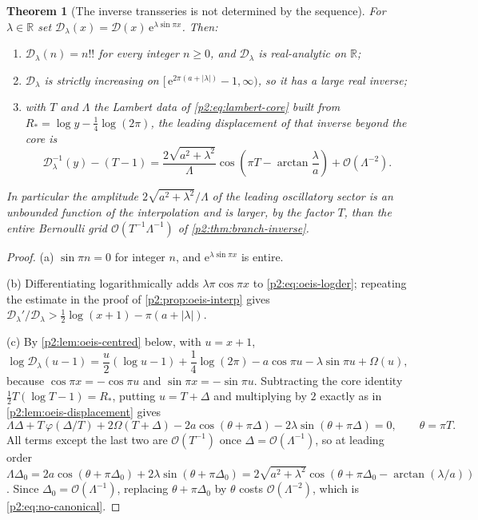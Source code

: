\documentclass[11pt,a4paper,oneside]{book}
\theoremstyle{plain}
\newtheorem{theorem}{Theorem}[chapter]
\theoremstyle{definition}
\theoremstyle{remark}
\newcommand{\Real}{\mathbb{R}}
\newcommand{\e}{\mathrm{e}}
\newcommand{\bigO}{\mathcal{O}}
\begin{document}
\begin{theorem}[The inverse transseries is not determined by the sequence]
\label{p2:thm:no-canonical}
For \(\lambda\in\Real\) set
\(\mathscr D_\lambda(x)=\mathscr D(x)\,\e^{\lambda\sin\pi x}\).
Then:
\begin{enumerate}[label=\textup{(\alph*)}]
\item \(\mathscr D_\lambda(n)=n!!\) for every integer \(n\ge0\), and
      \(\mathscr D_\lambda\) is real-analytic on \(\Real\);
\item \(\mathscr D_\lambda\) is strictly increasing on
      \([\,\e^{2\pi(a+|\lambda|)}-1,\infty)\), so it has a large real inverse;
\item with \(T\) and \(\Lambda\) the Lambert data of
      \cref{p2:eq:lambert-core} built from
      \(R_*=\log y-\tfrac14\log(2\pi)\), the leading displacement of that
      inverse beyond the core is
      \begin{equation}
       \mathscr D_\lambda^{-1}(y)-(T-1)
       =\frac{2\sqrt{a^2+\lambda^2}}{\Lambda}
        \cos\!\left(\pi T-\arctan\frac\lambda a\right)
        +\bigO\!\left(\Lambda^{-2}\right).
       \label{p2:eq:no-canonical}
      \end{equation}
\end{enumerate}
In particular the amplitude \(2\sqrt{a^2+\lambda^2}/\Lambda\) of the leading
oscillatory sector is an unbounded function of the interpolation and is
\emph{larger, by the factor \(T\), than the entire Bernoulli grid}
\(\bigO(T^{-1}\Lambda^{-1})\) of \cref{p2:thm:branch-inverse}.
\end{theorem}

\begin{proof}
(a) \(\sin\pi n=0\) for integer \(n\), and \(\e^{\lambda\sin\pi x}\) is entire.

(b) Differentiating logarithmically adds \(\lambda\pi\cos\pi x\) to
\cref{p2:eq:oeis-logder}; repeating the estimate in the proof of
\cref{p2:prop:oeis-interp} gives
\(\mathscr D_\lambda'/\mathscr D_\lambda>\tfrac12\log(x+1)-\pi(a+|\lambda|)\).

(c) By \cref{p2:lem:oeis-centred} below, with \(u=x+1\),
\[
 \log\mathscr D_\lambda(u-1)
 =\frac u2(\log u-1)+\frac14\log(2\pi)-a\cos\pi u
   -\lambda\sin\pi u+\Omega(u),
\]
because \(\cos\pi x=-\cos\pi u\) and \(\sin\pi x=-\sin\pi u\).  Subtracting the
core identity \(\tfrac12T(\log T-1)=R_*\), putting \(u=T+\Delta\) and
multiplying by \(2\) exactly as in \cref{p2:lem:oeis-displacement} gives
\[
 \Lambda\Delta+T\,\varphi(\Delta/T)
 +2\Omega(T+\Delta)
 -2a\cos(\theta+\pi\Delta)-2\lambda\sin(\theta+\pi\Delta)=0,
 \qquad\theta=\pi T .
\]
All terms except the last two are \(\bigO(T^{-1})\) once
\(\Delta=\bigO(\Lambda^{-1})\), so at leading order
\(\Lambda\Delta_0=2a\cos(\theta+\pi\Delta_0)+2\lambda\sin(\theta+\pi\Delta_0)
=2\sqrt{a^2+\lambda^2}\cos(\theta+\pi\Delta_0-\arctan(\lambda/a))\).
Since \(\Delta_0=\bigO(\Lambda^{-1})\), replacing
\(\theta+\pi\Delta_0\) by \(\theta\) costs \(\bigO(\Lambda^{-2})\), which is
\cref{p2:eq:no-canonical}.
\end{proof}
\end{document}
